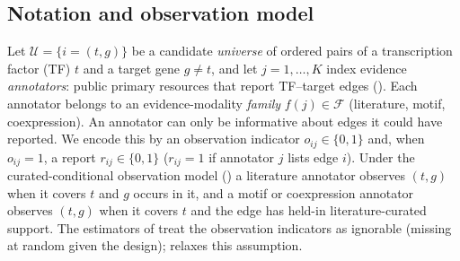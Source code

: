 \subsection{Notation and observation model}\label{sec:notation}
Let $\mathcal{U}=\{i=(t,g)\}$ be a candidate \emph{universe} of ordered pairs of a transcription factor (TF) $t$ and a target gene $g\neq t$, and let $j=1,\dots,K$ index evidence \emph{annotators}: public primary resources that report TF--target edges ().
Each annotator belongs to an evidence-modality \emph{family} $f(j)\in\mathcal{F}$ (literature, motif, coexpression).
An annotator can only be informative about edges it could have reported. We encode this by an observation indicator $o_{ij}\in\{0,1\}$ and, when $o_{ij}=1$, a report $r_{ij}\in\{0,1\}$ ($r_{ij}=1$ if annotator $j$ lists edge $i$).
Under the curated-conditional observation model () a literature annotator observes $(t,g)$ when it covers $t$ and $g$ occurs in it, and a motif or coexpression annotator observes $(t,g)$ when it covers $t$ and the edge has held-in literature-curated support.
The estimators of  treat the observation indicators as ignorable (missing at random given the design);  relaxes this assumption.

